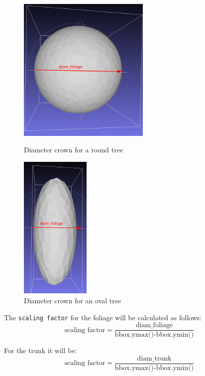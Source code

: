 \documentclass[12pt]{article}
\begin{document}
\begin{figure}[H]
    \centering
    \begin{minipage}{0.45\textwidth}
        \centering
        \includegraphics[height=7cm]{images/diam_foliage_round.png}
        \caption{Diameter crown for a round tree}
    \end{minipage}
    \begin{minipage}{0.45\textwidth}
        \centering
        \includegraphics[height=7cm]{images/diam_foliage_oval.png}
        \caption{Diameter crown for an oval tree}
    \end{minipage}
\end{figure}

The \texttt{scaling factor} for the foliage will be calculated as follows:
\begin{equation}
    \text{scaling factor} = \frac{\text{diam\_foliage}}{\text{bbox.ymax()-bbox.ymin()}}
\end{equation}

For the trunk it will be:
\begin{equation}
    \text{scaling factor} = \frac{\text{diam\_trunk}}{\text{bbox.ymax()-bbox.ymin()}}
\end{equation}
\end{document}
